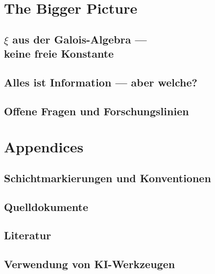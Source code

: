 \documentclass[11pt,oneside]{book}
\theoremstyle{plain}
\begin{document}
\part{The Bigger Picture}
\chapter[\texorpdfstring{$\xi$}{xi} aus der Galois-Algebra]{$\xi$ aus der Galois-Algebra ---\\ keine freie Konstante}

\chapter[Alles ist Information]{Alles ist Information --- aber welche?}

\chapter{Offene Fragen und Forschungslinien}
\label{ch:offene_fragen}


\backmatter
\appendix
\part*{Appendices}
\chapter{Schichtmarkierungen und Konventionen}

\chapter{Quelldokumente}

\chapter{Literatur}

\chapter{Verwendung von KI-Werkzeugen}

\end{document}
